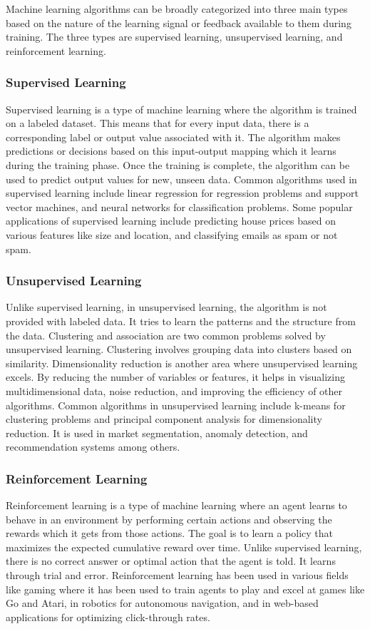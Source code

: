 Machine learning algorithms can be broadly categorized into three main types based on the nature of the learning signal or feedback available to them during training. The three types are supervised learning, unsupervised learning, and reinforcement learning.

\subsubsection{Supervised Learning}
Supervised learning is a type of machine learning where the algorithm is trained on a labeled dataset. This means that for every input data, there is a corresponding label or output value associated with it. The algorithm makes predictions or decisions based on this input-output mapping which it learns during the training phase. Once the training is complete, the algorithm can be used to predict output values for new, unseen data. Common algorithms used in supervised learning include linear regression for regression problems and support vector machines, and neural networks for classification problems. Some popular applications of supervised learning include predicting house prices based on various features like size and location, and classifying emails as spam or not spam.

\subsubsection{Unsupervised Learning}
Unlike supervised learning, in unsupervised learning, the algorithm is not provided with labeled data. It tries to learn the patterns and the structure from the data. Clustering and association are two common problems solved by unsupervised learning. Clustering involves grouping data into clusters based on similarity. Dimensionality reduction is another area where unsupervised learning excels. By reducing the number of variables or features, it helps in visualizing multidimensional data, noise reduction, and improving the efficiency of other algorithms. Common algorithms in unsupervised learning include k-means for clustering problems and principal component analysis for dimensionality reduction. It is used in market segmentation, anomaly detection, and recommendation systems among others.

\subsubsection{Reinforcement Learning}
Reinforcement learning is a type of machine learning where an agent learns to behave in an environment by performing certain actions and observing the rewards which it gets from those actions. The goal is to learn a policy that maximizes the expected cumulative reward over time. Unlike supervised learning, there is no correct answer or optimal action that the agent is told. It learns through trial and error. Reinforcement learning has been used in various fields like gaming where it has been used to train agents to play and excel at games like Go and Atari, in robotics for autonomous navigation, and in web-based applications for optimizing click-through rates.

